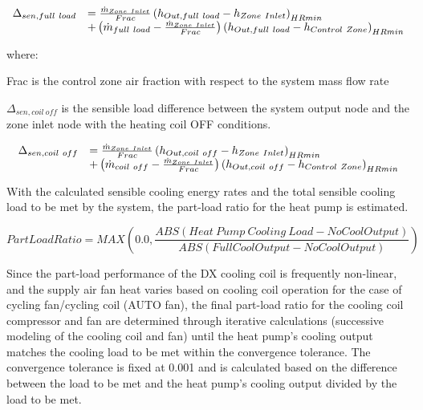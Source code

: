 \begin{equation}
  \begin{array}{rl}
    \Delta_{sen,full~load} &= \frac{\dot{m}_{Zone~Inlet}}{Frac} \left(h_{Out,full~load} - h_{Zone~Inlet}\right)_{HRmin} \\
                           &+ \left(\dot{m}_{full~load} - \frac{\dot{m}_{Zone~Inlet}}{Frac}\right) \left(h_{Out,full~load} - h_{Control~Zone}\right)_{HRmin}
  \end{array}
\end{equation}

where:

Frac is the control zone air fraction with respect to the system mass flow rate

\(\Delta_{sen,coil~off}\) is the sensible load difference between the system output node and the zone inlet node with the heating coil OFF conditions.

\begin{equation}
  \begin{array}{rl}
    \Delta_{sen,coil~off} &= \frac{\dot{m}_{Zone~Inlet}}{Frac} \left(h_{Out,coil~off} - h_{Zone~Inlet}\right)_{HRmin} \\
                           &+ \left(\dot{m}_{coil~off} - \frac{\dot{m}_{Zone~Inlet}}{Frac}\right) \left(h_{Out,coil~off} - h_{Control~Zone}\right)_{HRmin}
  \end{array}
\end{equation}

With the calculated sensible cooling energy rates and the total sensible cooling load to be met by the system, the part-load ratio for the heat pump is estimated.

\begin{equation}
PartLoadRatio = MAX\left( {0.0,\frac{{ABS\left( {Heat~Pump~Cooling~Load - NoCoolOutput} \right)}}{{ABS\left( {FullCoolOutput - NoCoolOutput} \right)}}} \right)
\label{eq:UnitarySystemPartLoadRatioCooling586}
\end{equation}

Since the part-load performance of the DX cooling coil is frequently non-linear, and the supply air fan heat varies based on cooling coil operation for the case of cycling fan/cycling coil (AUTO fan), the final part-load ratio for the cooling coil compressor and fan are determined through iterative calculations (successive modeling of the cooling coil and fan) until the heat pump's cooling output matches the cooling load to be met within the convergence tolerance. The convergence tolerance is fixed at 0.001 and is calculated based on the difference between the load to be met and the heat pump's cooling output divided by the load to be met.

